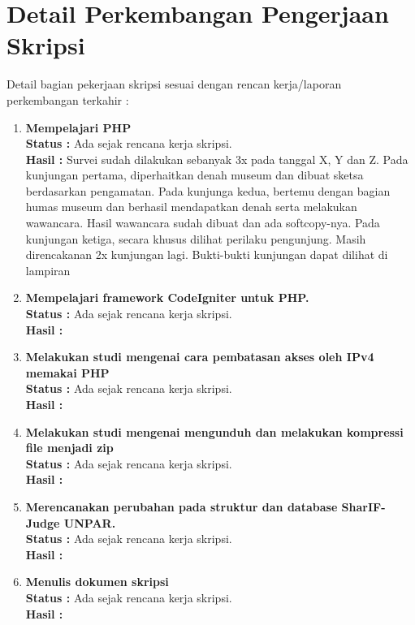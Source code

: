 \documentclass[a4paper,twoside]{article}
\begin{document}
\section{Detail Perkembangan Pengerjaan Skripsi}
Detail bagian pekerjaan skripsi sesuai dengan rencan kerja/laporan perkembangan terkahir :
	\begin{enumerate}
		\item \textbf{Mempelajari PHP}\\
		{\bf Status :} Ada sejak rencana kerja skripsi.\\
		{\bf Hasil :} Survei sudah dilakukan sebanyak 3x pada tanggal X, Y dan Z. Pada kunjungan pertama, diperhaitkan denah museum dan dibuat sketsa berdasarkan pengamatan. Pada kunjunga kedua, bertemu dengan bagian humas museum dan berhasil mendapatkan denah serta melakukan wawancara. Hasil wawancara sudah dibuat dan ada softcopy-nya. Pada kunjungan ketiga, secara khusus dilihat perilaku pengunjung. Masih direncakanan 2x kunjungan lagi. Bukti-bukti kunjungan dapat dilihat di lampiran
		
		\item \textbf{Mempelajari framework CodeIgniter untuk PHP.}\\
		{\bf Status :} Ada sejak rencana kerja skripsi.\\
		{\bf Hasil :}

		\item \textbf{Melakukan studi mengenai cara pembatasan akses oleh IPv4 memakai PHP}\\
		{\bf Status :} Ada sejak rencana kerja skripsi.\\
		{\bf Hasil :}

		\item \textbf{Melakukan studi mengenai mengunduh dan melakukan kompressi file menjadi zip}\\
		{\bf Status :} Ada sejak rencana kerja skripsi.\\
		{\bf Hasil :}

		\item \textbf{Merencanakan perubahan pada struktur dan database SharIF-Judge UNPAR.}\\
		{\bf Status :} Ada sejak rencana kerja skripsi.\\
		{\bf Hasil :}

		\item \textbf{Menulis dokumen skripsi}\\
		{\bf Status :} Ada sejak rencana kerja skripsi.\\
		{\bf Hasil :} 

	\end{enumerate}
\end{document}
